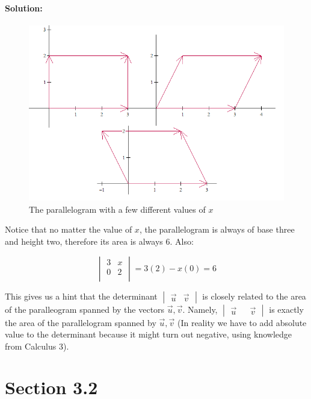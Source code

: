 \documentclass[12pt, letterpaper]{article}
\theoremstyle{statement}
\theoremstyle{statement}
\newenvironment{Solution}{\noindent\ignorespaces\paragraph{Solution:}}{\hfill \ding{122}\par\noindent}
\begin{document}
\begin{Solution}
    \begin{figure}[H]
        \centering
        \includegraphics[scale=0.5]{Untitled}
        \caption{The parallelogram with a few different values of $x$}
        \label{vectors2}
    \end{figure}
    
    Notice that no matter the value of $x$, the parallelogram is always of base three and height two, therefore its area is always $6$. Also: 

    $$
    \begin{vmatrix}
    3 & x \\
    0 & 2 \\
    \end{vmatrix}
    = 3(2) - x(0) = 6
    $$
    \end{Solution}
    
    This gives us a hint that the determinant $\begin{vmatrix} \Vec{u} & \Vec{v}\end{vmatrix} $ is closely related to the area of the paralleogram spanned by the vectors $\Vec{u}, \Vec{v}$. Namely, $\begin{vmatrix} \Vec{u} && \Vec{v}\end{vmatrix}$ is exactly the area of the parallelogram spanned by $\Vec{u}, \Vec{v}$ (In reality we have to add absolute value to the determinant because it might turn out negative, using knowledge from Calculus 3).
    
    \section*{Section 3.2}
\end{document}
